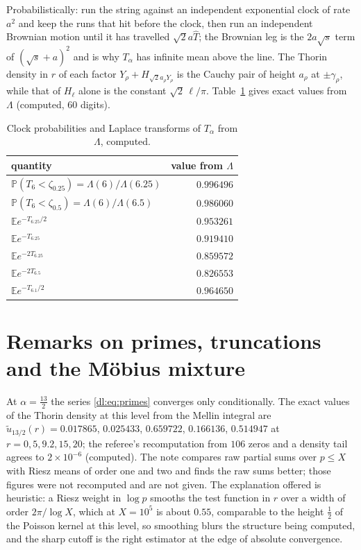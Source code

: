 Probabilistically: run the string against an independent exponential clock of rate $a^2$ and keep the runs that hit before the clock, then run an independent Brownian motion until it has travelled $\sqrt2a\widehat T$; the Brownian leg is the $2a\sqrt s$ term of $(\sqrt s+a)^2$ and is why $T_\alpha$ has infinite mean above the line. The Thorin density in $r$ of each factor $Y_\rho+H_{\sqrt2a_\rho Y_\rho}$ is the Cauchy pair of height $a_\rho$ at $\pm\gamma_\rho$, while that of $H_\ell$ alone is the constant $\sqrt2\,\ell/\pi$. Table~\ref{dl:tab:hit} gives exact values from $\Lambda$ (computed, $60$ digits).

\begin{table}[htbp]
\centering\small
\begin{tabular}{lr}
\toprule
quantity & value from $\Lambda$\\
\midrule
$\mathbb P(T_6<\zeta_{0.25})=\Lambda(6)/\Lambda(6.25)$ & $0.996496$\\
$\mathbb P(T_6<\zeta_{0.5})=\Lambda(6)/\Lambda(6.5)$ & $0.986060$\\
$\mathbb Ee^{-T_{6.25}/2}$ & $0.953261$\\
$\mathbb Ee^{-T_{6.25}}$ & $0.919410$\\
$\mathbb Ee^{-2T_{6.25}}$ & $0.859572$\\
$\mathbb Ee^{-2T_{6.5}}$ & $0.826553$\\
$\mathbb Ee^{-T_{6.1}/2}$ & $0.964650$\\
\bottomrule
\end{tabular}
\caption{Clock probabilities and Laplace transforms of $T_\alpha$ from $\Lambda$, computed.}\label{dl:tab:hit}
\end{table}

\section{Remarks on primes, truncations and the M\"obius mixture}\label{dl:sec:remarks}

\begin{remark}\label{dl:rem:r1}
At $\alpha=\frac{13}2$ the series \eqref{dl:eq:primes} converges only conditionally. The exact values of the Thorin density at this level from the Mellin integral are $\tilde u_{13/2}(r)=0.017865$, $0.025433$, $0.659722$, $0.166136$, $0.514947$ at $r=0,5,9.2,15,20$; the referee's recomputation from $106$ zeros and a density tail agrees to $2\times10^{-6}$ (computed). The note compares raw partial sums over $p\le X$ with Riesz means of order one and two and finds the raw sums better; those figures were not recomputed and are not given. The explanation offered is heuristic: a Riesz weight in $\log p$ smooths the test function in $r$ over a width of order $2\pi/\log X$, which at $X=10^5$ is about $0.55$, comparable to the height $\frac12$ of the Poisson kernel at this level, so smoothing blurs the structure being computed, and the sharp cutoff is the right estimator at the edge of absolute convergence.
\end{remark}

